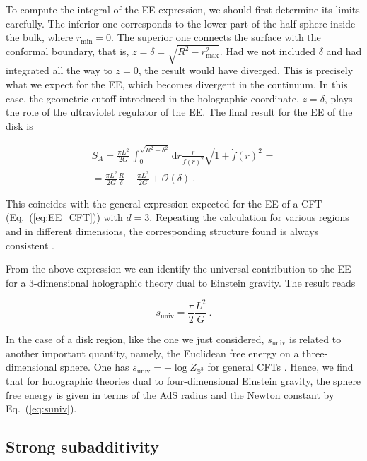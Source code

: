 \documentclass[twocolumn]{revtex4}
\providecommand{\eq}[2]{
    \begin{equation}
        #2
    \label{eq:#1}
    \end{equation}
}
\providecommand{\eqgat}[2]{
    \begin{gather}
        #2
    \label{eq:#1}
    \end{gather}
}
\begin{document}
To compute the integral of the EE expression, we should first determine its limits carefully. The inferior one corresponds to the lower part of the half sphere inside the bulk, where $r_\text{min}=0$. The superior one connects the surface with the conformal boundary, that is, $z=\delta=\sqrt{R^2-r_\text{max}^2}$. Had we not included $\delta$ and had integrated all the way to $z=0$, the result would have diverged. This is precisely what we expect for the EE, which becomes divergent in the continuum. In this case, the geometric cutoff introduced in the holographic coordinate, $z=\delta$, plays the role of the ultraviolet regulator of the EE. The final result for the EE of the disk is 
\eqgat{1sol}{
    S_A = \frac{\pi L^2}{2G} \, \int_0^{\sqrt{R^2-\delta^2}} \mathrm{d}r \frac{r}{f(r)^2} \sqrt{ 1 + \dot{f}(r)^2 } = \nonumber \\
    = \frac{\pi L^2}{2G} \frac{R}{\delta} - \frac{\pi L^2}{2G}+\mathcal{O}(\delta) \ . \nonumber
}
This coincides with the general expression expected for the EE of a CFT (Eq.~(\ref{eq:EE_CFT})) with $d=3$. Repeating the calculation for various regions and in different dimensions, the corresponding structure found is always consistent \cite{ryu_aspects_2006,ryu_holographic_2008}. 

From the above expression we can identify the universal contribution to the EE for a 3-dimensional holographic theory dual to Einstein gravity. The result reads
\eq{suniv}{
     s_\text{univ} = \frac{\pi}{2} \frac{L^2}{G} \ .
}
In the case of a disk region, like the one we just considered, $s_\text{univ}$ is related to another important quantity, namely, the Euclidean free energy on a three-dimensional sphere. One has $s_\text{univ}= -\log Z_{\mathbb{S}^3}$ for general CFTs \cite{casini_towards_2011}. Hence, we find that for holographic theories dual to four-dimensional Einstein gravity, the sphere free energy is given in terms of the AdS radius and the Newton constant by Eq.~(\ref{eq:suniv}).


\subsection{Strong subadditivity} \label{ss:SS}
\end{document}
